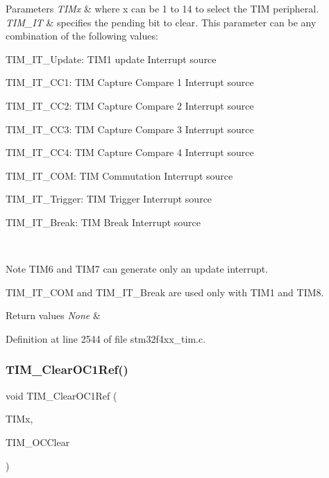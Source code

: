\begin{DoxyParams}{Parameters}
{\em T\+I\+Mx} & where x can be 1 to 14 to select the T\+IM peripheral. \\
\hline
{\em T\+I\+M\+\_\+\+IT} & specifies the pending bit to clear. This parameter can be any combination of the following values\+: \begin{DoxyItemize}
\item T\+I\+M\+\_\+\+I\+T\+\_\+\+Update\+: T\+I\+M1 update Interrupt source \item T\+I\+M\+\_\+\+I\+T\+\_\+\+C\+C1\+: T\+IM Capture Compare 1 Interrupt source \item T\+I\+M\+\_\+\+I\+T\+\_\+\+C\+C2\+: T\+IM Capture Compare 2 Interrupt source \item T\+I\+M\+\_\+\+I\+T\+\_\+\+C\+C3\+: T\+IM Capture Compare 3 Interrupt source \item T\+I\+M\+\_\+\+I\+T\+\_\+\+C\+C4\+: T\+IM Capture Compare 4 Interrupt source \item T\+I\+M\+\_\+\+I\+T\+\_\+\+C\+OM\+: T\+IM Commutation Interrupt source \item T\+I\+M\+\_\+\+I\+T\+\_\+\+Trigger\+: T\+IM Trigger Interrupt source \item T\+I\+M\+\_\+\+I\+T\+\_\+\+Break\+: T\+IM Break Interrupt source\end{DoxyItemize}
\\
\hline
\end{DoxyParams}
\begin{DoxyNote}{Note}
T\+I\+M6 and T\+I\+M7 can generate only an update interrupt. 

T\+I\+M\+\_\+\+I\+T\+\_\+\+C\+OM and T\+I\+M\+\_\+\+I\+T\+\_\+\+Break are used only with T\+I\+M1 and T\+I\+M8.
\end{DoxyNote}

\begin{DoxyRetVals}{Return values}
{\em None} & \\
\hline
\end{DoxyRetVals}


Definition at line 2544 of file stm32f4xx\+\_\+tim.\+c.

\mbox{\label{group___t_i_m_ga34e926cd8a99cfcc7480b2d6de5118b6}} 
\subsubsection{\texorpdfstring{T\+I\+M\+\_\+\+Clear\+O\+C1\+Ref()}{TIM\_ClearOC1Ref()}}
{\footnotesize\ttfamily void T\+I\+M\+\_\+\+Clear\+O\+C1\+Ref (\begin{DoxyParamCaption}\item[{\hyperlink{struct_t_i_m___type_def}{T\+I\+M\+\_\+\+Type\+Def} $\ast$}]{T\+I\+Mx,  }\item[{uint16\+\_\+t}]{T\+I\+M\+\_\+\+O\+C\+Clear }\end{DoxyParamCaption})}



